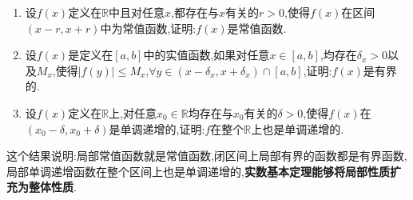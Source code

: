\documentclass[../../main.tex]{subfiles}%
\begin{document}
\begin{example}
\begin{enumerate}
\item 设\(f(x)\)定义在\(\mathbb{R}\)中且对任意\(x\),都存在与\(x\)有关的\(r > 0\),使得\(f(x)\)在区间\((x - r,x + r)\)中为常值函数,证明:\(f(x)\)是常值函数.

\item 设\(f(x)\)是定义在\([a,b]\)中的实值函数,如果对任意\(x\in[a,b]\),均存在\(\delta_x>0\)以及\(M_x\),使得\(\vert f(y)\vert\leqslant  M_x\),\(\forall y\in(x - \delta_x,x + \delta_x)\cap [a,b]\),证明:\(f(x)\)是有界的.
\item 设\(f(x)\)定义在\(\mathbb{R}\)上,对任意\(x_0\in\mathbb{R}\)均存在与\(x_0\)有关的\(\delta>0\),使得\(f(x)\)在\((x_0 - \delta,x_0 + \delta)\)是单调递增的,证明:\(f\)在整个\(\mathbb{R}\)上也是单调递增的.
\end{enumerate}
\end{example}
\begin{remark}
这个结果说明:局部常值函数就是常值函数,闭区间上局部有界的函数都是有界函数,局部单调递增函数在整个区间上也是单调递增的,\textbf{实数基本定理能够将局部性质扩充为整体性质}.
\end{remark}
\end{document}
